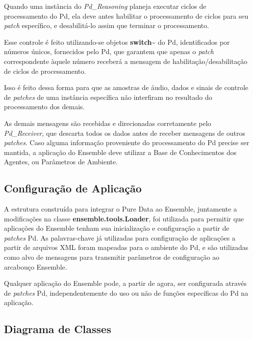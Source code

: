 \documentclass[a4paper, 11pt, twoside]{article}
\begin{document}
\begin{multicols}{2}
Quando uma instância do \textit{Pd\_Reasoning} planeja executar ciclos de 
processamento do Pd, ela deve antes habilitar o processamento de ciclos 
para seu \textit{patch} específico, e desabilitá-lo assim que terminar o 
processamento.

Esse controle é feito utilizando-se objetos \textbf{switch\~} do Pd,
identificados por números únicos, fornecidos pelo Pd, que garantem
que apenas o \textit{patch} correspondente àquele número receberá a
mensagem de habilitação/desabilitação de ciclos de processamento.

Isso é feito dessa forma para que as amostras de áudio, dados e sinais de 
controle de \textit{patches} de uma instância específica não interfiram no
resultado do processamento dos demais.

As demais mensagens são recebidas e direcionadas corretamente pelo 
\textit{Pd\_Receiver}, que descarta todos os dados antes de receber 
mensagens de outros \textit{patches}. Caso alguma informação proveniente
do processamento do Pd precise ser mantida, a aplicação do Ensemble deve
utilizar a Base de Conhecimentos dos Agentes, ou Parâmetros de Ambiente.

\subsection{Configuração de Aplicação}

A estrutura construída para integrar o Pure Data ao Ensemble,
juntamente a modificações na classe \textbf{ensemble.tools.Loader}, 
foi utilizada para permitir que aplicações do Ensemble tenham sua 
inicialização e configuração a partir de \textit{patches} Pd. 
As palavras-chave já utilizadas para configuração de
aplicações a partir de arquivos XML foram mapeadas para o ambiente do Pd,
e são utilizadas como alvo de mensagens para transmitir parâmetros 
de configuração ao arcabouço Ensemble.

Qualquer aplicação do Ensemble pode, a partir de agora,  ser configurada através 
de \textit{patches} Pd, independentemente do uso ou não de funções específicas do Pd na aplicação.

\subsection{Diagrama de Classes}\label{sec:diagrama}

\end{multicols}
\begin{figure}[H]
  \centering
  \label{fig2}
\end{figure}
\end{document}
